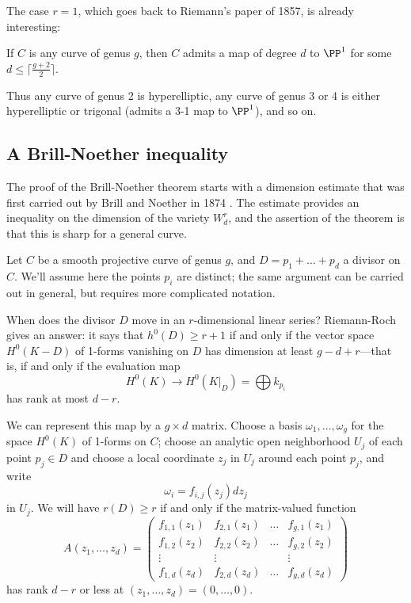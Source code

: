 The case $r=1$, which goes back to Riemann's paper of 1857, is already interesting:

\begin{corollary}
If $C$ is any curve of genus $g$, then $C$ admits a map of degree $d$ to $\PP^1$ for some $d \leq \lceil \frac{g+2}{2}\rceil$.
\end{corollary}

Thus any curve of genus 2 is hyperelliptic, any curve of genus 3 or 4 is either hyperelliptic or trigonal  (admits a 3-1 map to $\PP^1$), and so on.


\subsection{A Brill-Noether inequality}

The proof of the Brill-Noether theorem starts with a dimension estimate that was first carried out by Brill and Noether in 1874 \cite{Brill-NoetherOriginal}. The estimate provides an inequality on the dimension
of the variety $W^r_d$, and the assertion of the theorem is that this is sharp for a general curve.


Let $C$ be a smooth projective curve of genus $g$, and $D = p_1 + \dots + p_d$ a divisor on $C$. We'll assume here the points $p_i$ are distinct; the same argument  can be carried out in general, but requires more complicated notation.

When does the divisor $D$ move in an $r$-dimensional linear series? Riemann-Roch gives an answer: it says that $h^0(D) \geq r+1$ if and only if the vector space $H^0(K-D)$ of 1-forms vanishing on $D$ has dimension at least $g-d+r$---that is, if and only if the  evaluation map
$$
H^0(K) \to H^0(K|_D) = \bigoplus k_{p_i}
$$
has rank at most $d-r$. 

We can represent this map by a $g \times d$ matrix. Choose a basis $\omega_1,\dots,\omega_g$ for the space $H^0(K)$ of 1-forms on $C$; choose an analytic open neighborhood $U_j$ of each point $p_j \in D$ and choose a local coordinate $z_j$ in $U_j$ around each point $p_j$, and write
$$
\omega_i = f_{i,j}(z_j)dz_j
$$
in $U_j$. We will have $r(D) \geq r$ if and only if the  matrix-valued function
$$
A(z_1,\dots,z_d) = 
\begin{pmatrix}
f_{1,1}(z_1) & f_{2,1}(z_1) & \dots & f_{g,1}(z_1) \\
f_{1,2}(z_2) & f_{2,2}(z_2) & \dots & f_{g,2}(z_2) \\
\vdots & \vdots &  & \vdots \\
f_{1,d}(z_d) & f_{2,d}(z_d) & \dots & f_{g,d} (z_d)
\end{pmatrix}
$$
has rank $d-r$ or less at $(z_1,\dots,z_d) = (0,\dots,0)$.

